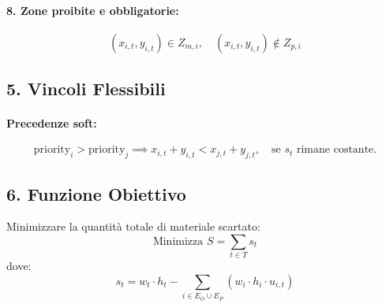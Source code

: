 \paragraph{8. Zone proibite e obbligatorie:}
\[
(x_{i,t}, y_{i,t}) \in Z_{m,i}, \quad (x_{i,t}, y_{i,t}) \not\in Z_{p,i}
\]

\subsection*{5. Vincoli Flessibili}

\paragraph{Precedenze soft:}
\[
\text{priority}_i > \text{priority}_j \implies x_{i,t} + y_{i,t} < x_{j,t} + y_{j,t}, \quad \text{se } s_t \text{ rimane costante.}
\]

\subsection*{6. Funzione Obiettivo}
Minimizzare la quantità totale di materiale scartato:
\[
\text{Minimizza } S = \sum_{t \in T} s_t
\]
dove:
\[
s_t = w_t \cdot h_t - \sum_{i \in E_O \cup E_P} (w_i \cdot h_i \cdot u_{i,t})
\]








